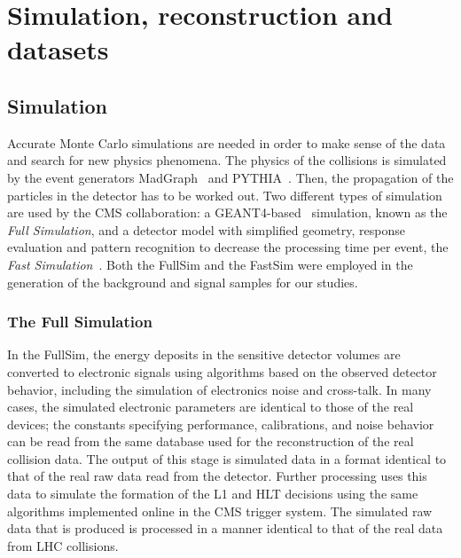 \chapter{Simulation, reconstruction and datasets}
\section{Simulation}\label{sec:fast_sim}
Accurate Monte Carlo simulations are needed in order to make sense of the
data and search for new physics phenomena. The physics of the collisions is
simulated by the event generators MadGraph~\cite{madgraph} and PYTHIA~\cite{fs:pythia}. Then, the propagation of the particles in the detector has to be worked out.
Two different types of simulation are used by the CMS collaboration: a
GEANT4-based~\cite{fs:geant} simulation, known as the \emph{Full
Simulation}, and a detector model with simplified geometry, response
evaluation and pattern recognition to decrease the processing time per
event, the \emph{Fast Simulation}~\cite{fs:fast.simulation}. Both the
FullSim and the FastSim were employed in the generation of the background
and signal samples for our studies.

\subsection{The Full Simulation}
In the FullSim, the energy deposits in the sensitive detector volumes are converted to electronic
signals using algorithms based on the observed detector behavior, including the simulation of
electronics noise and cross-talk. In many cases, the simulated electronic parameters are identical to
those of the real devices; the constants specifying performance, calibrations, and noise behavior
can be read from the same database used for the reconstruction of the real collision data. The output of
this stage is simulated data in a format identical to that of the real raw data read from the detector.
Further processing uses this data to simulate the formation of the L1 and
HLT decisions using the same algorithms implemented online in the CMS trigger system. The simulated
raw data that is produced is processed in a manner identical to that of the real data from
LHC collisions.

